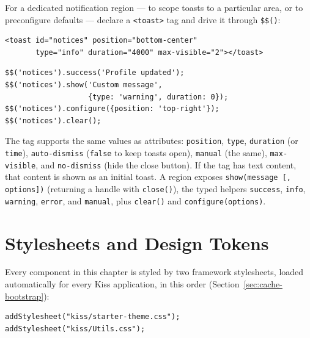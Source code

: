 \noindent
For a dedicated notification region --- to scope toasts to a particular area, or to preconfigure defaults --- declare a \texttt{<toast>} tag and drive it through \texttt{\$\$()}:

\begin{lstlisting}[style=html]
<toast id="notices" position="bottom-center"
       type="info" duration="4000" max-visible="2"></toast>
\end{lstlisting}

\begin{lstlisting}[style=javascript]
$$('notices').success('Profile updated');
$$('notices').show('Custom message',
                   {type: 'warning', duration: 0});
$$('notices').configure({position: 'top-right'});
$$('notices').clear();
\end{lstlisting}

\noindent
The tag supports the same values as attributes: \texttt{position}, \texttt{type}, \texttt{duration} (or \texttt{time}), \texttt{auto-dismiss} (\texttt{false} to keep toasts open), \texttt{manual} (the same), \texttt{max-visible}, and \texttt{no-dismiss} (hide the close button).  If the tag has text content, that content is shown as an initial toast.  A region exposes \texttt{show(message [, options])} (returning a handle with \texttt{close()}), the typed helpers \texttt{success}, \texttt{info}, \texttt{warning}, \texttt{error}, and \texttt{manual}, plus \texttt{clear()} and \texttt{configure(options)}.

\section{Stylesheets and Design Tokens}
\label{sec:comp-stylesheets}

Every component in this chapter is styled by two framework stylesheets, loaded automatically for every Kiss application, in this order (Section~\ref{sec:cache-bootstrap}):

\begin{lstlisting}[style=javascript]
addStylesheet("kiss/starter-theme.css");
addStylesheet("kiss/Utils.css");
\end{lstlisting}

